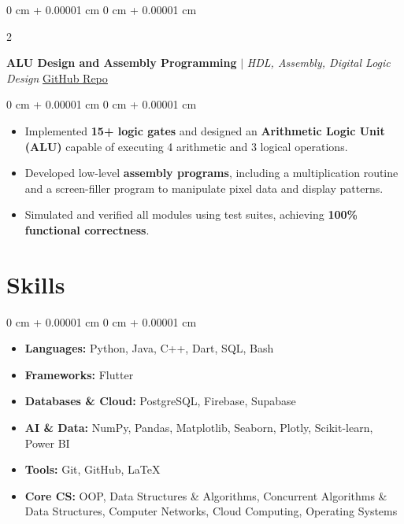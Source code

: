 \documentclass[9pt, letterpaper]{extarticle}
\newenvironment{highlights}{
    \begin{itemize}[
        topsep=0.06 cm,
        parsep=0.06 cm,
        partopsep=0pt,
        itemsep=0pt,
        leftmargin=0 cm + 10pt
    ]
}{
    \end{itemize}
} %
\newenvironment{onecolentry}{
    \begin{adjustwidth}{
        0 cm + 0.00001 cm
    }{
        0 cm + 0.00001 cm
    }
}{
    \end{adjustwidth}
} %
\newenvironment{twocolentry}[2][]{
    \onecolentry
    \def\secondColumn{#2}
    \setcolumnwidth{\fill, 4.5 cm}
    \begin{paracol}{2}
}{
    \switchcolumn \raggedleft \secondColumn
    \end{paracol}
    \endonecolentry
} %
\begin{document}
        \begin{twocolentry}{
            \href{https://github.com/abdellatif72/Nand2Tetris}{\underline{GitHub Repo}}
        }
            \textbf{ALU Design and Assembly Programming} $|$ \textit{HDL, Assembly, Digital Logic Design}\end{twocolentry}

        \begin{onecolentry}
            \begin{highlights}
                \item Implemented \textbf{15+ logic gates} and designed an \textbf{Arithmetic Logic Unit (ALU)} capable of executing 4 arithmetic and 3 logical operations.
                \item Developed low-level \textbf{assembly programs}, including a multiplication routine and a screen-filler program to manipulate pixel data and display patterns.
                \item Simulated and verified all modules using test suites, achieving \textbf{100\% functional correctness}.
            \end{highlights}
        \end{onecolentry}

    \section{Skills}
        \begin{onecolentry}
            \begin{highlights}
                \item \textbf{Languages:} Python, Java, C++, Dart, SQL, Bash
                \item \textbf{Frameworks:} Flutter
                \item \textbf{Databases \& Cloud:} PostgreSQL, Firebase, Supabase
                \item \textbf{AI \& Data:} NumPy, Pandas, Matplotlib, Seaborn, Plotly, Scikit-learn, Power BI
                \item \textbf{Tools:} Git, GitHub, LaTeX
                \item \textbf{Core CS:} OOP, Data Structures \& Algorithms, Concurrent Algorithms \& Data Structures, Computer Networks, Cloud Computing, Operating Systems
            \end{highlights}
        \end{onecolentry}
\end{document}

